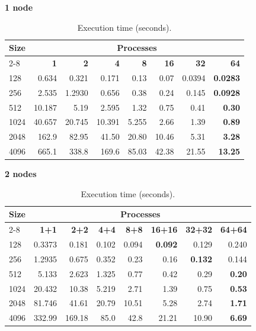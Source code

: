 \begin{table}[H]
\centering
\begin{minipage}[t]{0.48\textwidth}
\centering
\textbf{1 node}\\
\begin{tabular}{l|rrrrrrr}
\hline
\textbf{Size} & \multicolumn{7}{c}{\textbf{Processes}} \\
\cline{2-8}
 & \textbf{1} & \textbf{2} & \textbf{4} & \textbf{8} & \textbf{16} & \textbf{32} & \textbf{64} \\
\hline
128 & 0.634 & 0.321 & 0.171 & 0.13 & 0.07 & 0.0394 & \textbf{0.0283} \\
256 & 2.535 & 1.2930 & 0.656 & 0.38 & 0.24 & 0.145 & \textbf{0.0928} \\
512 & 10.187 & 5.19 & 2.595 & 1.32 & 0.75 & 0.41 & \textbf{0.30} \\
1024 & 40.657 & 20.745 & 10.391 & 5.255 & 2.66 & 1.39 & \textbf{0.89} \\
2048 & 162.9 & 82.95 & 41.50 & 20.80 & 10.46 & 5.31 & \textbf{3.28} \\
4096 & 665.1 & 338.8 & 169.6 & 85.03 & 42.38 & 21.55 & \textbf{13.25} \\
\hline
\end{tabular}
\end{minipage}
\hfill
\begin{minipage}[t]{0.48\textwidth}
\centering
\textbf{2 nodes}\\
\begin{tabular}{l|rrrrrrr}
\hline
\textbf{Size} & \multicolumn{7}{c}{\textbf{Processes}} \\
\cline{2-8}
 & \textbf{1+1} & \textbf{2+2} & \textbf{4+4} & \textbf{8+8} & \textbf{16+16} & \textbf{32+32} & \textbf{64+64} \\
\hline
128 & 0.3373 & 0.181 & 0.102 & 0.094 & \textbf{0.092} & 0.129 & 0.240 \\
256 & 1.2935 & 0.675 & 0.352 & 0.23 & 0.16 & \textbf{0.132} & 0.144 \\
512 & 5.133 & 2.623 & 1.325 & 0.77 & 0.42 & 0.29 & \textbf{0.20} \\
1024 & 20.432 & 10.38 & 5.219 & 2.71 & 1.39 & 0.75 & \textbf{0.53} \\
2048 & 81.746 & 41.61 & 20.79 & 10.51 & 5.28 & 2.74 & \textbf{1.71} \\
4096 & 332.99 & 169.18 & 85.0 & 42.8 & 21.21 & 10.90 & \textbf{6.69} \\
\hline
\end{tabular}
\end{minipage}
\caption{Execution time (seconds).}
\end{table}
